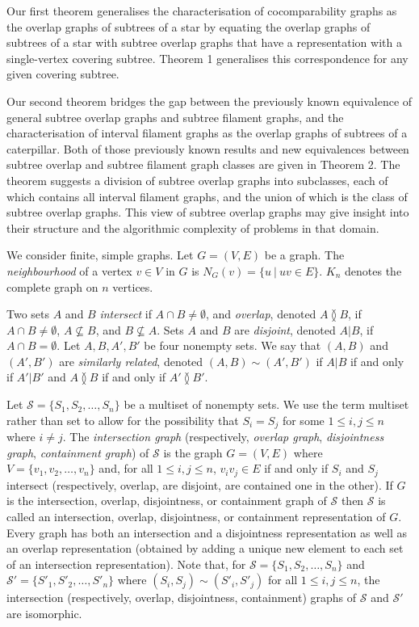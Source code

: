 \documentclass[
final
]{dmtcs-episciences}        \usepackage{graphics, amsthm, amsmath, amssymb, algorithm, algorithmic}
\begin{document}
Our first theorem generalises the characterisation of cocomparability graphs as the overlap graphs of subtrees of a star by equating the overlap graphs of subtrees of a star with subtree overlap graphs that have a representation with a single-vertex covering subtree. Theorem 1 generalises this correspondence for any given covering subtree.

Our second theorem bridges the gap between the previously known equivalence of general subtree overlap graphs and subtree filament graphs, and the characterisation of interval filament graphs as the overlap graphs of subtrees of a caterpillar. Both of those previously known results and new equivalences between subtree overlap and subtree filament graph classes are given in Theorem 2. The theorem suggests a division of subtree overlap graphs into subclasses,
each of which contains all interval filament graphs, and the union of which
is the class of subtree overlap graphs. 
This view of subtree overlap graphs may give insight into their structure and the algorithmic complexity of problems in that domain. 

We consider finite, simple graphs. Let $G=(V,E)$ be a graph.
The {\em neighbourhood} of a vertex $v \in V$ in $G$ is $N_G(v) = \{ u ~|~ uv \in E \}$.
$K_n$ denotes the complete graph on $n$ vertices.

Two sets $A$ and $B$ {\em intersect} if $A \cap B \ne \emptyset$, and
{\em overlap}, denoted $A \between B$, if $A \cap B \ne \emptyset$, $A \not\subseteq B$, and $B \not\subseteq A$. Sets $A$ and $B$ are {\em disjoint}, denoted $A | B$, if $A \cap B = \emptyset$.
Let $A, B, A', B'$ be four nonempty sets.  We say that $(A, B)$ and $(A', B')$ are \emph{similarly related}, denoted $(A, B) \sim (A',B')$ if $A|B$ if and only if $A'|B'$ and $A \between B$ if and only if $A' \between B'$. 

Let $\mathcal{S} = \{ S_1, S_2, \ldots, S_n \}$ be a multiset of nonempty sets. We use the term multiset rather than set to allow for the possibility that $S_i = S_j$ for some $1 \le i,j \le n$ where $i \ne j$. The {\em intersection graph} 
(respectively, {\em overlap graph}, {\em disjointness graph}, {\em containment graph}) of $\mathcal{S}$ is the graph $G=(V,E)$ where $V = \{ v_1, v_2, \ldots, v_n\}$ and, for all $1 \le i,j \le n$, $v_i v_j \in E$ if and only if $S_i$ and $S_j$ intersect (respectively, overlap, are disjoint, are contained one in the other). 
If $G$ is the intersection,
overlap, disjointness, or containment graph of $\mathcal{S}$ then $\mathcal{S}$ is
called an intersection, overlap, disjointness, or containment representation
of $G$. Every graph has both an intersection and a disjointness
representation \cite{Marcz} as well as an overlap representation (obtained
by adding a unique new element to each set of
an intersection representation). 
Note
that, for $\mathcal{S} = \{ S_1, S_2, \ldots, S_n \}$ and 
$\mathcal{S'} = \{ S'_1, S'_2, \ldots, S'_n \}$ where
$(S_i, S_j) \sim (S'_i, S'_j)$ for all $1 \le i,j \le n$,
the intersection (respectively,
overlap, disjointness, containment) graphs of $\mathcal{S}$ and $\mathcal{S'}$ are
isomorphic.
\end{document}
